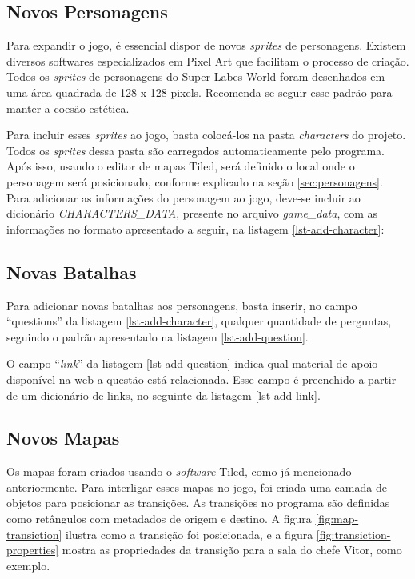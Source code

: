 \subsection{Novos Personagens}
Para expandir o jogo, é essencial dispor de novos \textit{sprites} de personagens. Existem diversos softwares especializados em Pixel Art que facilitam o processo de criação. Todos os \textit{sprites} de personagens do Super Labes World foram desenhados em uma área quadrada de 128 x 128 pixels. Recomenda-se seguir esse padrão para manter a coesão estética.

Para incluir esses \textit{sprites} ao jogo, basta colocá-los na pasta \textit{characters} do projeto. Todos os \textit{sprites} dessa pasta são carregados automaticamente pelo programa. Após isso, usando o editor de mapas Tiled, será definido o local onde o personagem será posicionado, conforme explicado na seção \ref{sec:personagens}. Para adicionar as informações do personagem ao jogo, deve-se incluir ao dicionário \textit{CHARACTERS\_DATA}, presente no arquivo \textit{game\_data}, com as informações no formato apresentado a seguir, na listagem \ref{lst-add-character}:



\clearpage
\subsection{Novas Batalhas}
Para adicionar novas batalhas aos personagens, basta inserir, no campo ``questions'' da listagem \ref{lst-add-character}, qualquer quantidade de perguntas, seguindo o padrão apresentado na listagem \ref{lst-add-question}.



O campo ``\textit{link}'' da listagem \ref{lst-add-question} indica qual material de apoio disponível na web a questão está relacionada. Esse campo é preenchido a partir de um dicionário de links, no seguinte da listagem \ref{lst-add-link}.



\clearpage
\subsection{Novos Mapas} 
Os mapas foram criados usando o \textit{software} Tiled, como já mencionado anteriormente. Para interligar esses mapas no jogo, foi criada uma camada de objetos para posicionar as transições. As transições no programa são definidas como retângulos com metadados de origem e destino. A figura \ref{fig:map-transiction} ilustra como a transição foi posicionada, e a figura \ref{fig:transiction-properties} mostra as propriedades da transição para a sala do chefe Vitor, como exemplo.

